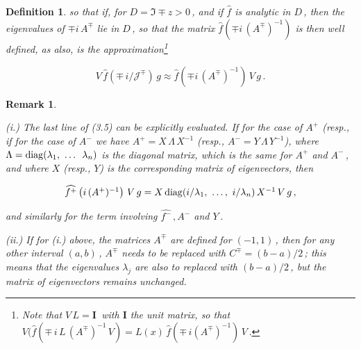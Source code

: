 \documentclass[11pt]{article}
\newtheorem{remark}[Theorem]{Remark}
\newenvironment{Remark}{\begin{remark}\rm}{\end{remark}}
\newtheorem{Definition}[Theorem]{Definition}
\begin{document}
\begin{Definition}
\noindent so that if, for $D = \Im \mp z > 0$\,, and if $\hat{f}$ is
analytic in $D$\,, then the eigenvalues of $\mp i\,A^\mp$ lie in
$D$\,, so that the matrix $\hat{f}(\mp i\,(A^\mp)^{-1})$ is then well
defined, as also, is the approximation\footnote{Note that $V\,L =
  {\mathbf I}$\, with ${\mathbf I}$ the unit matrix, so that
  $V(\hat{f}\left(\mp\,i\,L\,(A^\mp)^{-1}\,V\right) =
  L(x)\,\hat{f}\left(\mp\,i (A^{\mp})^{-1}\right)\,V$\,.}

\begin{equation}%
    V\,\hat{f}(\mp\,i/{\mathcal J}^\mp)\,g \approx \hat{f}\left(\mp
    i\,(A^\mp)^{-1}\right) \, V\,g\,.
  \label{equation:3.5} 
  \end{equation}

 \end{Definition}

 \vspace{.1in} \noindent
 \begin{Remark}%
   \label{remark:3.2}
   \begin{description}
   \item{(i.)} The last line of (3.5) can be explicitly evaluated.  If
     for the case of $A^+$ (resp., if for the case of $A^-$ we have
     $A^+ = X\,\Lambda\,X^{-1}$ (resp., $A^- = Y\,\Lambda\,Y^{-1}$),
     where $\Lambda = {\rm diag}(\lambda_1,\ \ldots\,\ \lambda_n)$ is
     the diagonal matrix, which is the same for $A^+$ and $A^-$\,, and
     where $X$ (resp., $Y$) is the corresponding matrix of
     eigenvectors, then

 \begin{equation}%
   \begin{array}{rcl}
     \widehat{f^+}\left(i\,(A^+)^{-1}\right) \, V\,g = X \,
     {\rm diag}(i/\lambda_1,\ \ldots,\ i/\lambda_n) \, X^{-1} \, V\,g\,,
   \end{array}
   \label{equation:3.6}
 \end{equation}

 \noindent and similarly for the term involving $\widehat{f^-}\,, A^-$
 and $Y$\,.   

 \item{(ii.)} If for (i.) above, the matrices $A^\mp$ are defined for
   $(-1,1)$\,, then for any other interval $(a,b)$\,, $A^\mp$ needs to
   be replaced with $C^\mp = (b-a)/2$\,; this means that the
   eigenvalues $\lambda_j$ are also to replaced with $(b-a)/2$\,, but
   the matrix of eigenvectors remains unchanged.
   \end{description}
   \end{Remark}
 
\end{document}

